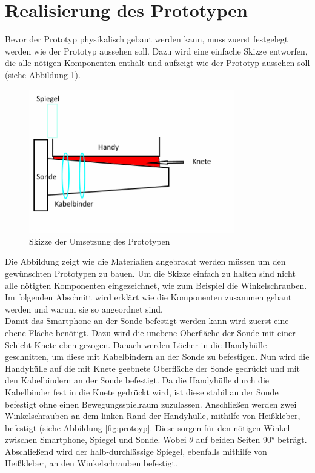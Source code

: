 \section{Realisierung des Prototypen}

Bevor der Prototyp physikalisch gebaut werden kann, muss zuerst festgelegt werden wie der Prototyp aussehen soll. Dazu wird eine einfache Skizze entworfen, die alle nötigen Komponenten enthält und aufzeigt wie der Prototyp aussehen soll (siehe Abbildung \ref{fig:protoyp_skizze_umsetzung}).
\begin{figure}[h]
	\centering
	\includegraphics[width=0.80\textwidth]{Prototypen_Bau/Prototyp_skizze}
	\caption{Skizze der Umsetzung des Prototypen}
	\label{fig:protoyp_skizze_umsetzung}
\end{figure}
Die Abbildung zeigt wie die Materialien angebracht werden müssen um den gewünschten Prototypen zu bauen. Um die Skizze einfach zu halten sind nicht alle nötigten Komponenten eingezeichnet, wie zum Beispiel die Winkelschrauben. Im folgenden Abschnitt wird erklärt wie die Komponenten zusammen gebaut werden und warum sie so angeordnet sind.\\
Damit das Smartphone an der Sonde befestigt werden kann wird zuerst eine ebene Fläche benötigt. Dazu wird die unebene Oberfläche der Sonde mit einer Schicht Knete eben gezogen. Danach werden Löcher in die Handyhülle geschnitten, um diese mit Kabelbindern an der Sonde zu befestigen. Nun wird die Handyhülle auf die mit Knete geebnete Oberfläche der Sonde gedrückt und mit den Kabelbindern an der Sonde befestigt. Da die Handyhülle durch die Kabelbinder fest in die Knete gedrückt wird, ist diese stabil an der Sonde befestigt ohne einen Bewegungsspielraum zuzulassen. Anschließen werden zwei Winkelschrauben an dem linken Rand der Handyhülle, mithilfe von Heißkleber, befestigt (siehe Abbildung \ref{fig:protoyp}. Diese sorgen für den nötigen Winkel zwischen Smartphone, Spiegel und Sonde. Wobei $\theta$ auf beiden Seiten 90° beträgt. Abschließend wird der halb-durchlässige Spiegel, ebenfalls mithilfe von Heißkleber, an den Winkelschrauben befestigt.\\
